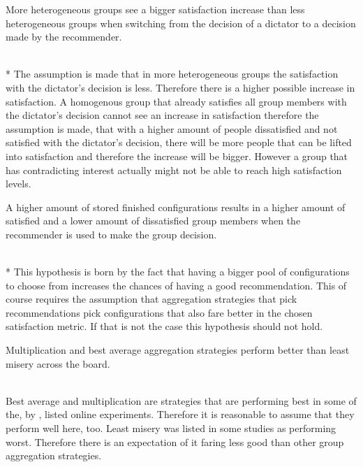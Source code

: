 \begin{hypothesis}
    \begin{itshape}
        \label{hyp:Evaluation:HeterogenousBiggerSatisfactionIncrease} More heterogeneous groups see a bigger satisfaction increase than less heterogeneous groups when switching from the decision of a dictator to a decision made by the recommender.
    \end{itshape} \medskip \\*
    The assumption is made that in more heterogeneous groups the satisfaction with the dictator's decision is less. Therefore there is a higher possible increase in satisfaction. A homogenous group that already satisfies all group members with the dictator's decision cannot see an increase in satisfaction therefore the assumption is made, that with a higher amount of people dissatisfied and not satisfied with the dictator's decision, there will be more people that can be lifted into satisfaction and therefore the increase will be bigger. However a group that has contradicting interest actually might not be able to reach high satisfaction levels.
\end{hypothesis}

\begin{hypothesis}
    \begin{itshape}
        \label{hyp:Evaluation:StoreSizeBetterResults} A higher amount of stored finished configurations results in a higher amount of satisfied and a lower amount of dissatisfied group members when the recommender is used to make the group decision.
    \end{itshape} \medskip \\*
    This hypothesis is born by the fact that having a bigger pool of configurations to choose from increases the chances of having a good recommendation. This of course requires the assumption that aggregation strategies that pick recommendations pick configurations that also fare better in the chosen satisfaction metric. If that is not the case this hypothesis should not hold.
\end{hypothesis}

\begin{hypothesis}
    \begin{itshape}
        \label{hyp:Evaluation:AggregationStrategies} Multiplication and best average aggregation strategies perform better than least misery across the board.
    \end{itshape} \medskip \\
    Best average and multiplication are strategies that are performing best in some of the, by \citeauthor{Masthoff2015} \cite[p. 755f]{Masthoff2015}, listed online experiments. Therefore it is reasonable to assume that they perform well here, too. Least misery was listed in some studies as performing worst. Therefore there is an expectation of it faring less good than other group aggregation strategies.
\end{hypothesis}

